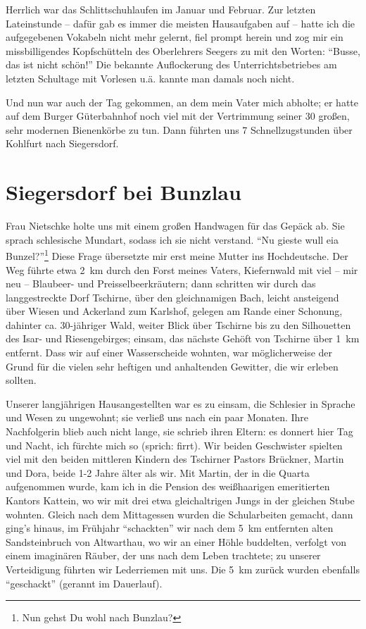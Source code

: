 Herrlich war das Schlittschuhlaufen im Januar und Februar. Zur letzten Lateinstunde -- dafür gab es immer die meisten Hausaufgaben auf -- hatte ich die aufgegebenen Vokabeln nicht mehr gelernt, fiel prompt herein und zog mir ein missbilligendes Kopfschütteln des Oberlehrers Seegers zu mit den Worten: \enquote{Busse, das ist nicht schön!} Die bekannte Auflockerung des Unterrichtsbetriebes am letzten Schultage mit Vorlesen u.ä. kannte man damals noch nicht.

Und nun war auch der Tag gekommen, an dem mein Vater mich abholte; er hatte auf dem Burger Güterbahnhof noch viel mit der Vertrimmung seiner 30 großen, sehr modernen Bienenkörbe zu tun. Dann führten uns 7 Schnellzugstunden über Kohlfurt nach Siegersdorf.


\section{Siegersdorf bei Bunzlau}
Frau Nietschke holte uns mit einem großen Handwagen für das Gepäck ab. Sie sprach schlesische Mundart, sodass ich sie nicht verstand. \enquote{Nu gieste wull eia Bunzel?}\footnote{Nun gehst Du wohl nach Bunzlau?} Diese Frage übersetzte mir erst meine Mutter ins Hochdeutsche. Der Weg führte etwa 2~km durch den Forst meines Vaters, Kiefernwald mit viel -- mir neu -- Blaubeer- und Preisselbeerkräutern; dann schritten wir durch das langgestreckte Dorf Tschirne, über den gleichnamigen Bach, leicht ansteigend über Wiesen und Ackerland zum Karlshof, gelegen am Rande einer Schonung, dahinter ca. 30-jähriger Wald, weiter Blick über Tschirne bis zu den Silhouetten des Isar- und Riesengebirges; einsam, das nächste Gehöft von Tschirne über 1~km entfernt. Dass wir auf einer Wasserscheide wohnten, war möglicherweise der Grund für die vielen sehr heftigen und anhaltenden Gewitter, die wir erleben sollten.

Unserer langjährigen Hausangestellten war es zu einsam, die Schlesier in Sprache und Wesen zu ungewohnt; sie verließ uns nach ein paar Monaten. Ihre Nachfolgerin blieb auch nicht lange, sie schrieb ihren Eltern: es donnert hier Tag und Nacht, ich fürchte mich so (sprich: firrt). Wir beiden Geschwister spielten viel mit den beiden mittleren Kindern des Tschirner Pastors Brückner, Martin und Dora, beide 1-2 Jahre älter als wir. Mit Martin, der in die Quarta aufgenommen wurde, kam ich in die Pension des weißhaarigen emeritierten Kantors Kattein, wo wir mit drei etwa gleichaltrigen Jungs in der gleichen Stube wohnten. Gleich nach dem Mittagessen wurden die Schularbeiten gemacht, dann ging's hinaus, im Frühjahr \enquote{schackten} wir nach dem 5~km entfernten alten Sandsteinbruch von Altwarthau, wo wir an einer Höhle buddelten, verfolgt von einem imaginären Räuber, der uns nach dem Leben trachtete; zu unserer Verteidigung führten wir Lederriemen mit uns. Die 5~km zurück wurden ebenfalls \enquote{geschackt} (gerannt im Dauerlauf).

